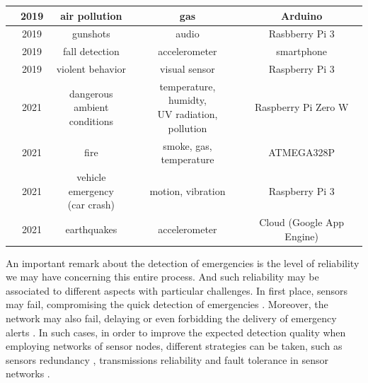 \begin{refsection}
\begin{table}
{\begin{tabular}{c|c|c|c|c}
    \hline
    \citeauthor{iotPollution1} & 2019 & air pollution & gas & Arduino \\
    
    \hline
    \citeauthor{iotAudio1} & 2019 & gunshots & audio & Rasbberry Pi 3 \\
    
    \hline
    \citeauthor{ThresholdBasedFallDetection2019} & 2019 & fall detection & accelerometer & smartphone \\
    
    \hline
    \citeauthor{visualdataEmergency5} & 2019 & violent behavior & visual sensor & Raspberry Pi 3 \\
    
    \hline
    \citeauthor{iotBike1} & 2021 & \makecell{dangerous ambient\\conditions} & \makecell{temperature, humidty,\\UV radiation, pollution} & Raspberry Pi Zero W \\
    
    \hline
    \citeauthor{iotFire3} & 2021 & fire & smoke, gas, temperature & ATMEGA328P\\
    
    \hline
    \citeauthor{CarCrash2021} & 2021 & \makecell{vehicle emergency\\(car crash)} & motion, vibration & Raspberry Pi 3 \\
    
    \hline
    \citeauthor{earthquakesDetection2011} & 2021 & earthquakes &  accelerometer & Cloud (Google App Engine) \\
  \end{tabular}
  }
\end{table}

An important remark about the detection of emergencies is the level of reliability we may have concerning this entire process. And such reliability may be associated to different aspects with particular challenges. In first place, sensors may fail, compromising the quick detection of emergencies \cite{availability1,availability2}. Moreover, the network may also fail, delaying or even forbidding the delivery of emergency alerts \cite{networking1,networking2}.
In such cases, in order to improve the expected detection quality when employing networks of sensor nodes, different strategies can be taken, such as sensors redundancy \cite{redundancy2}, transmissions reliability \cite{reliability1} and fault tolerance in sensor networks \cite{redundancy1}. 


\end{refsection}
